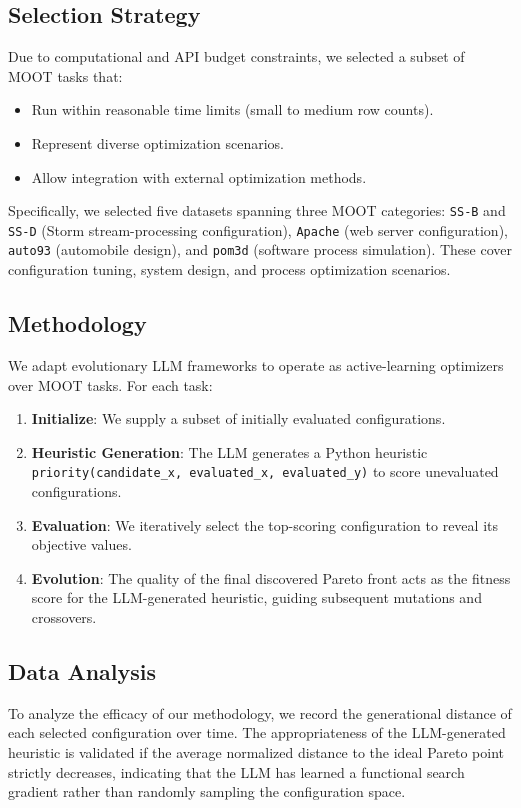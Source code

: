 \documentclass[sigconf,nonacm]{acmart}
\begin{document}
\subsection{Selection Strategy}

Due to computational and API budget constraints, we selected a subset of MOOT tasks that:
\begin{itemize}
\item Run within reasonable time limits (small to medium row counts).
\item Represent diverse optimization scenarios.
\item Allow integration with external optimization methods.
\end{itemize}
Specifically, we selected five datasets spanning three MOOT categories: \texttt{SS-B} and \texttt{SS-D} (Storm stream-processing configuration), \texttt{Apache} (web server configuration), \texttt{auto93} (automobile design), and \texttt{pom3d} (software process simulation). These cover configuration tuning, system design, and process optimization scenarios.

\subsection{Methodology}

We adapt evolutionary LLM frameworks to operate as active-learning optimizers over MOOT tasks. For each task:
\begin{enumerate}
\item \textbf{Initialize}: We supply a subset of initially evaluated configurations.
\item \textbf{Heuristic Generation}: The LLM generates a Python heuristic \texttt{priority(candidate\_x, evaluated\_x, evaluated\_y)} to score unevaluated configurations.
\item \textbf{Evaluation}: We iteratively select the top-scoring configuration to reveal its objective values.
\item \textbf{Evolution}: The quality of the final discovered Pareto front acts as the fitness score for the LLM-generated heuristic, guiding subsequent mutations and crossovers.
\end{enumerate}

\subsection{Data Analysis}

To analyze the efficacy of our methodology, we record the generational distance of each selected configuration over time. The appropriateness of the LLM-generated heuristic is validated if the average normalized distance to the ideal Pareto point strictly decreases, indicating that the LLM has learned a functional search gradient rather than randomly sampling the configuration space.
\end{document}

